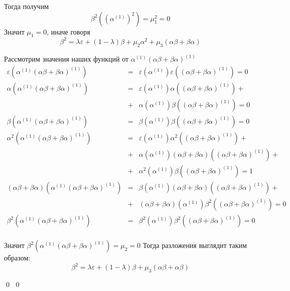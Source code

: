 \documentclass[12pt, reqno, a4paper, oneside, notitlepage]{amsart}
\makeatletter
\theoremstyle{mytheoremstyle}
\theoremstyle{myremarkstyle}
\numberwithin{equation}{section}
\renewenvironment{proof}[1][\proofname]{\par\indent {\bfseries #1\@addpunct{.} }}{\qed}
\makeatother
\begin{document}
\begin{proof}
\begin{proof}
    Тогда получим \[
    \beta^2\left(\left(\alpha^{(1)}\right)^2\right) = \mu_1^2 = 0
    \]
    Значит $\mu_1 = 0$, иначе говоря \[
    \beta^2 = \lambda\varepsilon+(1-\lambda)\beta + \mu_2\alpha^2 + \mu_3(\alpha\beta+\beta\alpha)
    \]

    Рассмотрим значения наших функций от $\alpha^{(1)}(\alpha\beta+\beta\alpha)^{(1)}$
    \begin{eqnarray*}
    \varepsilon\left(\alpha^{(1)}(\alpha\beta+\beta\alpha)^{(1)}\right) &=& 
    \varepsilon\left(\alpha^{(1)}\right)\varepsilon\left((\alpha\beta+\beta\alpha)^{(1)}\right) = 0\\
    \alpha\left(\alpha^{(1)}(\alpha\beta+\beta\alpha)^{(1)}\right) &=&
    \varepsilon\left(\alpha^{(1)}\right)\alpha\left((\alpha\beta+\beta\alpha)^{(1)}\right)+\\
    &+&\alpha\left(\alpha^{(1)}\right)\beta\left((\alpha\beta+\beta\alpha)^{(1)}\right) = 0\\
    \beta\left(\alpha^{(1)}(\alpha\beta+\beta\alpha)^{(1)}\right) &=&
    \beta\left(\alpha^{(1)}\right)\beta\left((\alpha\beta+\beta\alpha)^{(1)}\right) = 0\\
    \alpha^2\left(\alpha^{(1)}(\alpha\beta+\beta\alpha)^{(1)}\right) &=&
    \varepsilon\left(\alpha^{(1)}\right)\alpha^2\left((\alpha\beta+\beta\alpha)^{(1)}\right)+\\
    &+&
    \alpha\left(\alpha^{(1)}\right)(\alpha\beta+\beta\alpha)\left((\alpha\beta+\beta\alpha)^{(1)}\right)+\\
    &+& \alpha^2\left(\alpha^{(1)}\right)\beta\left((\alpha\beta+\beta\alpha)^{(1)}\right) = 1\\
    (\alpha\beta+\beta\alpha)\left(\alpha^{(1)}(\alpha\beta+\beta\alpha)^{(1)}\right) &=&
    \beta\left(\alpha^{(1)}\right)(\alpha\beta+\beta\alpha)\left((\alpha\beta+\beta\alpha)^{(1)}\right)+\\
    &+&(\alpha\beta+\beta\alpha)\left(\alpha^{(1)}\right)\beta^2\left((\alpha\beta+\beta\alpha)^{(1)}\right) = 0\\
    \beta^2\left(\alpha^{(1)}(\alpha\beta+\beta\alpha)^{(1)}\right) &=& \beta^2\left(\alpha^{(1)}\right)\beta^2\left((\alpha\beta+\beta\alpha)^{(1)}\right) = 0\\
    \end{eqnarray*}

    Значит $\beta^2\left(\alpha^{(1)}(\alpha\beta+\beta\alpha)^{(1)}\right) = \mu_2 = 0$
    Тогда разложения выглядит таким образом:\[
    \beta^2 = \lambda\varepsilon+ (1-\lambda)\beta + \mu_3(\alpha\beta+\alpha\beta)
    \]


\end{proof}
\end{proof}
\end{document}
